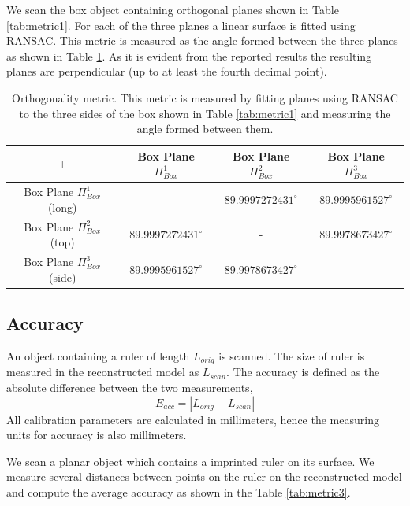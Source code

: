 \documentclass[final,12pt,3p]{elsarticle}
\begin{document}
We scan the box object containing orthogonal planes shown in Table \ref{tab:metric1}. For each of the three planes a linear surface is fitted using RANSAC. This metric is measured as the angle formed between the three planes as shown in Table \ref{tab:metric2}. As it is evident from the reported results the resulting planes are perpendicular (up to at least the fourth decimal point).

\begin{table}[!ht]
\centering
\begin{tabular}{| c | c | c | c |}
   \hline   
   $\perp$ & Box Plane $\Pi_{Box}^{1}$ & Box Plane $\Pi_{Box}^{2}$ & Box Plane $\Pi_{Box}^{3}$\\
   \hline
   Box Plane $\Pi_{Box}^{1}$ (long) & - & $89.9997272431^\circ$	& $89.9995961527^\circ$\\
   \hline
   Box Plane $\Pi_{Box}^{2}$ (top) & $89.9997272431^\circ$ & - & $89.9978673427^\circ$\\
   \hline
   Box Plane $\Pi_{Box}^{3}$ (side) & $89.9995961527^\circ$ & $89.9978673427^\circ$ & - \\
   \hline
\end{tabular}
  \caption{\label{tab:metric2} Orthogonality metric. This metric is measured by fitting planes using RANSAC to the three sides of the box shown in Table \ref{tab:metric1} and measuring the angle formed between them.}
\end{table}

\subsection{Accuracy}
An object containing a ruler of length $L_{orig}$ is scanned. The size of ruler is measured in the reconstructed model as $L_{scan}$. The accuracy is defined as the absolute difference between the two measurements, 
\begin{equation}
	E_{acc} = |L_{orig} - L_{scan}|
\end{equation}
All calibration parameters are calculated in millimeters, hence the measuring units for accuracy is also millimeters.

We scan a planar object which contains a imprinted ruler on its surface. We measure several distances between points on the ruler on the reconstructed model and compute the average accuracy as shown in the Table \ref{tab:metric3}.
\end{document}
